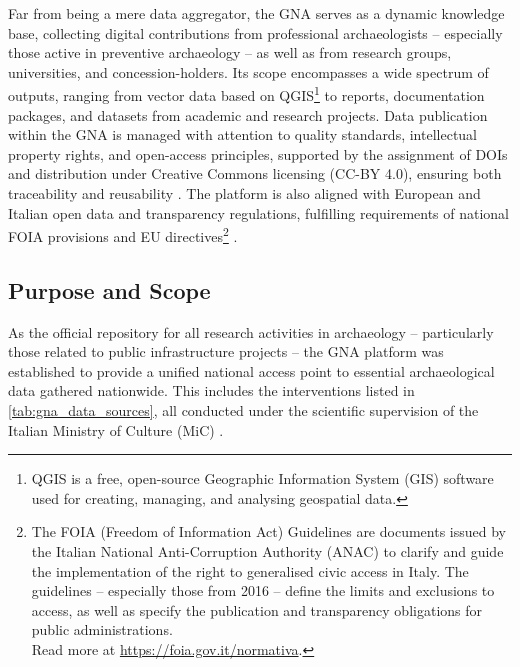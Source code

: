 \begin{spacing}{1.5}
Far from being a mere data aggregator, the GNA serves as a dynamic knowledge base, collecting digital contributions from professional archaeologists -- especially those active in preventive archaeology -- as well as from research groups, universities, and concession-holders. Its scope encompasses a wide spectrum of outputs, ranging from vector data based on QGIS\footnote{QGIS is a free, open-source Geographic Information System (GIS) software used for creating, managing, and analysing geospatial data.} to reports, documentation packages, and datasets from academic and research projects. Data publication within the GNA is managed with attention to quality standards, intellectual property rights, and open-access principles, supported by the assignment of DOIs and distribution under Creative Commons licensing (CC-BY 4.0), ensuring both traceability and reusability \citep{acconcia_pubblicazione_2023,falcone_dematerializzazione_2023,boi_il_2023}. The platform is also aligned with European and Italian open data and transparency regulations, fulfilling requirements of national FOIA provisions and EU directives\footnote{The FOIA (Freedom of Information Act) Guidelines are documents issued by the Italian National Anti-Corruption Authority (ANAC) to clarify and guide the implementation of the right to generalised civic access in Italy. The guidelines -- especially those from 2016 -- define the limits and exclusions to access, as well as specify the publication and transparency obligations for public administrations.\\Read more at \url{https://foia.gov.it/normativa}.\nocite{noauthor_normativa_2016}} \citep{falcone_dematerializzazione_2023}.

\subsection{Purpose and Scope}
As the official repository for all research activities in archaeology -- particularly those related to public infrastructure projects -- the GNA platform was established to provide a unified national access point to essential archaeological data gathered nationwide. This includes the interventions listed in \autoref{tab:gna_data_sources}, all conducted under the scientific supervision of the Italian Ministry of Culture (MiC) \citep{acconcia_pubblicazione_2023,falcone_dematerializzazione_2023}.


\end{spacing}

